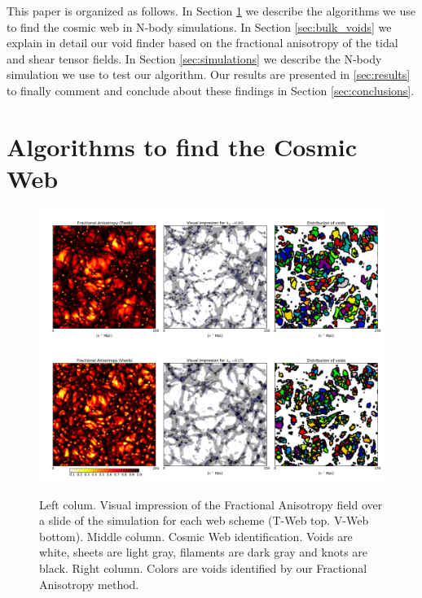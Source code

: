\documentclass[a4,useAMS,usenatbib,usegraphicx]{mn2e}
\begin{document}
This paper is organized as follows. 
In Section \ref{sec:algorithms_cosmic_web} we describe the algorithms
we use to find the cosmic web in N-body simulations. 
In Section \ref{sec:bulk_voids} we explain in detail our void finder
based on the fractional anisotropy of the tidal and shear tensor
fields. 
In Section  \ref{sec:simulations} we describe the N-body simulation we
use to test our algorithm. 
Our results are presented in \ref{sec:results} to finally comment and
conclude about these findings in Section \ref{sec:conclusions}. 


\section{Algorithms to find the Cosmic Web}
\label{sec:algorithms_cosmic_web}


\begin{figure}
  \includegraphics[trim = 16mm 8mm 5mm 12mm, clip, keepaspectratio=true,
  width=0.73\textheight]{cosmicweb_FA_Tweb.pdf}
  \includegraphics[trim = 16mm 8mm 5mm 12mm, clip, keepaspectratio=true,
  width=0.73\textheight]{cosmicweb_FA_Vweb.pdf}
  \caption{Left colum. Visual impression of the 
  Fractional Anisotropy field over a slide of the simulation for each
  web scheme (T-Web top. V-Web bottom).  
  Middle column. Cosmic Web identification. Voids
  are white, sheets are light gray, filaments are dark gray and
  knots are black.
  Right column. Colors are voids identified by our Fractional
  Anisotropy method.}
  \label{fig:FA_field}
\end{figure}
\end{document}
